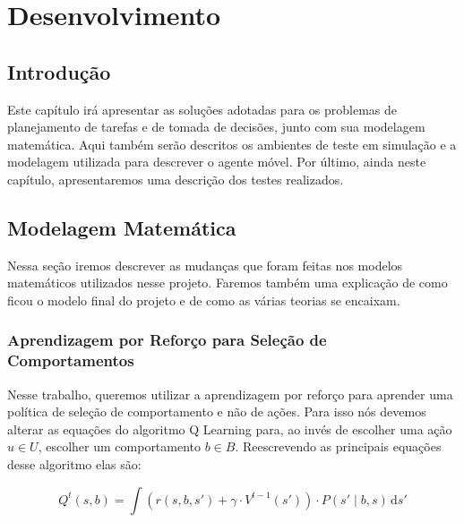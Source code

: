 


\chapter{Desenvolvimento} \label{chap:Desenvolvimento}


\section{Introdução}

Este capítulo irá apresentar as soluções adotadas para os problemas de planejamento de tarefas e de tomada de decisões, junto com sua modelagem matemática. Aqui também serão descritos os ambientes de teste em simulação e a modelagem utilizada para descrever o agente móvel. Por último, ainda neste capítulo, apresentaremos uma descrição dos testes realizados.

\section{Modelagem Matemática}

Nessa seção iremos descrever as mudanças que foram feitas nos modelos matemáticos utilizados nesse projeto. Faremos também uma explicação de como ficou o modelo final do projeto e de como as várias teorias se encaixam.

\subsection{Aprendizagem por Reforço para Seleção de Comportamentos} \label{subsection:QLearningSelecaoDeComportamento}

Nesse trabalho, queremos utilizar a aprendizagem por reforço para aprender uma política de seleção de comportamento e não de ações. Para isso nós devemos alterar as equações do algoritmo Q Learning para, ao invés de escolher uma ação $ u \in U $, escolher um comportamento $ b \in B $. Reescrevendo as principais equações desse algoritmo elas são:

\begin{equation} \label{equation:QValueFunctionBehavior}
    Q^t \left( s, b \right) = \int \! \left( r \left( s, b, s' \right) + \gamma \cdot V^{t-1} \left( s' \right) \right) \cdot P \left( s' \mid b, s \right) \, \mathrm{d}s'
\end{equation}


